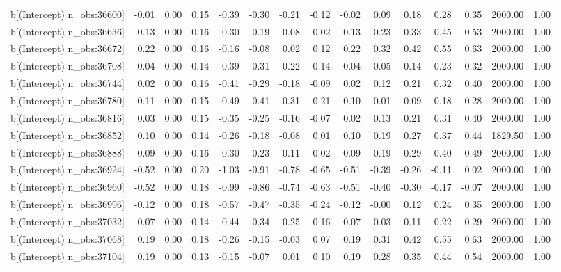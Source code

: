 \begin{table}[ht]
\begin{tabular}{rrrrrrrrrrrrrrr}
  b[(Intercept) n\_obs:36600] & -0.01 & 0.00 & 0.15 & -0.39 & -0.30 & -0.21 & -0.12 & -0.02 & 0.09 & 0.18 & 0.28 & 0.35 & 2000.00 & 1.00 \\ 
  b[(Intercept) n\_obs:36636] & 0.13 & 0.00 & 0.16 & -0.30 & -0.19 & -0.08 & 0.02 & 0.13 & 0.23 & 0.33 & 0.45 & 0.53 & 2000.00 & 1.00 \\ 
  b[(Intercept) n\_obs:36672] & 0.22 & 0.00 & 0.16 & -0.16 & -0.08 & 0.02 & 0.12 & 0.22 & 0.32 & 0.42 & 0.55 & 0.63 & 2000.00 & 1.00 \\ 
  b[(Intercept) n\_obs:36708] & -0.04 & 0.00 & 0.14 & -0.39 & -0.31 & -0.22 & -0.14 & -0.04 & 0.05 & 0.14 & 0.23 & 0.32 & 2000.00 & 1.00 \\ 
  b[(Intercept) n\_obs:36744] & 0.02 & 0.00 & 0.16 & -0.41 & -0.29 & -0.18 & -0.09 & 0.02 & 0.12 & 0.21 & 0.32 & 0.40 & 2000.00 & 1.00 \\ 
  b[(Intercept) n\_obs:36780] & -0.11 & 0.00 & 0.15 & -0.49 & -0.41 & -0.31 & -0.21 & -0.10 & -0.01 & 0.09 & 0.18 & 0.28 & 2000.00 & 1.00 \\ 
  b[(Intercept) n\_obs:36816] & 0.03 & 0.00 & 0.15 & -0.35 & -0.25 & -0.16 & -0.07 & 0.02 & 0.13 & 0.21 & 0.31 & 0.40 & 2000.00 & 1.00 \\ 
  b[(Intercept) n\_obs:36852] & 0.10 & 0.00 & 0.14 & -0.26 & -0.18 & -0.08 & 0.01 & 0.10 & 0.19 & 0.27 & 0.37 & 0.44 & 1829.50 & 1.00 \\ 
  b[(Intercept) n\_obs:36888] & 0.09 & 0.00 & 0.16 & -0.30 & -0.23 & -0.11 & -0.02 & 0.09 & 0.19 & 0.29 & 0.40 & 0.49 & 2000.00 & 1.00 \\ 
  b[(Intercept) n\_obs:36924] & -0.52 & 0.00 & 0.20 & -1.03 & -0.91 & -0.78 & -0.65 & -0.51 & -0.39 & -0.26 & -0.11 & 0.02 & 2000.00 & 1.00 \\ 
  b[(Intercept) n\_obs:36960] & -0.52 & 0.00 & 0.18 & -0.99 & -0.86 & -0.74 & -0.63 & -0.51 & -0.40 & -0.30 & -0.17 & -0.07 & 2000.00 & 1.00 \\ 
  b[(Intercept) n\_obs:36996] & -0.12 & 0.00 & 0.18 & -0.57 & -0.47 & -0.35 & -0.24 & -0.12 & -0.00 & 0.12 & 0.24 & 0.35 & 2000.00 & 1.00 \\ 
  b[(Intercept) n\_obs:37032] & -0.07 & 0.00 & 0.14 & -0.44 & -0.34 & -0.25 & -0.16 & -0.07 & 0.03 & 0.11 & 0.22 & 0.29 & 2000.00 & 1.00 \\ 
  b[(Intercept) n\_obs:37068] & 0.19 & 0.00 & 0.18 & -0.26 & -0.15 & -0.03 & 0.07 & 0.19 & 0.31 & 0.42 & 0.55 & 0.63 & 2000.00 & 1.00 \\ 
  b[(Intercept) n\_obs:37104] & 0.19 & 0.00 & 0.13 & -0.15 & -0.07 & 0.01 & 0.10 & 0.19 & 0.28 & 0.35 & 0.44 & 0.54 & 2000.00 & 1.00 \\ 

\end{tabular}
\end{table}
